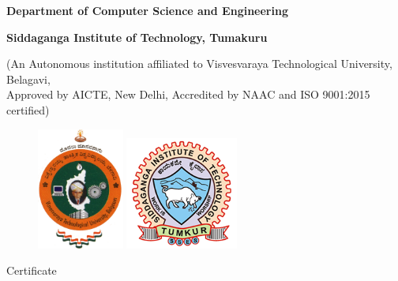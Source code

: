 \thispagestyle{empty}

\setlength{\toptafiddle}{1in}
\setlength{\bottafiddle}{1in}

\vspace*{-0.75in}
\enlargethispage{\toptafiddle}

\begin{center}

\begin{Large}
\textbf{Department of Computer Science and Engineering} \\
\end{Large}

\begin{Large}
\textbf{Siddaganga Institute of Technology, Tumakuru}\\
\end{Large}

\begin{small}

(An Autonomous institution affiliated to Visvesvaraya Technological University, Belagavi,\\ Approved by AICTE, New Delhi, Accredited by NAAC and ISO 9001:2015 certified)
\end{small}
\vspace{0.2cm}

\begin{figure}[h]
    \centering
    \includegraphics[height=4cm]{images/vtu.png}
    \hspace{0.1\textwidth}
    \includegraphics[height=3.7cm]{images/sit.png}
\end{figure}

\Huge{Certificate}
\end{center}

